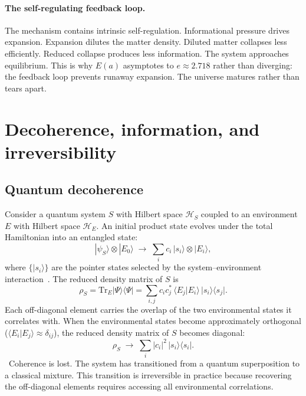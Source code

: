 \paragraph{The self-regulating feedback loop.} The mechanism contains intrinsic self-regulation. Informational pressure drives expansion. Expansion
dilutes the matter density. Diluted matter collapses less efficiently. Reduced collapse produces less information. The system approaches equilibrium.
This is why $E(a)$ asymptotes to $e\approx2.718$ rather than diverging: the feedback loop prevents runaway expansion. The universe matures rather than
tears apart. \interp

\section{Decoherence, information, and irreversibility}\label{sec:th:decoherence}
\subsection{Quantum decoherence}
Consider a quantum system $S$ with Hilbert space $\mathcal H_S$ coupled to an environment $E$ with Hilbert space $\mathcal H_E$. An initial product
state evolves under the total Hamiltonian into an entangled state:
\begin{equation}|\psi_S\rangle\otimes|E_0\rangle\;\longrightarrow\;\sum_i c_i\,|s_i\rangle\otimes|E_i\rangle ,\label{eq:th:entangle}\end{equation}
where $\{|s_i\rangle\}$ are the pointer states selected by the system--environment interaction~\cite{Zurek1981,Zurek2003}. The reduced density matrix of $S$ is
\begin{equation}\rho_S=\mathrm{Tr}_E|\Psi\rangle\langle\Psi|=\sum_{i,j}c_ic_j^*\,\langle E_j|E_i\rangle\,|s_i\rangle\langle s_j| .\end{equation}
Each off-diagonal element carries the overlap of the two environmental states it correlates with. When the environmental states become approximately
orthogonal ($\langle E_i|E_j\rangle\approx\delta_{ij}$), the reduced density matrix of $S$ becomes diagonal:
\begin{equation}\rho_S\;\longrightarrow\;\sum_i|c_i|^2\,|s_i\rangle\langle s_i| .\label{eq:th:diag}\end{equation}
\derived\ Coherence is lost. The system has transitioned from a quantum superposition to a classical mixture. This transition is irreversible in
practice because recovering the off-diagonal elements requires accessing all environmental correlations.

